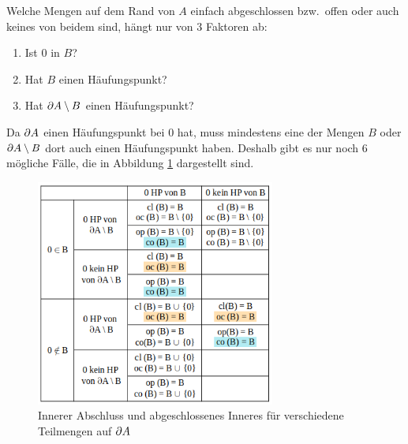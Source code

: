     Welche
    Mengen auf dem Rand von $A$ einfach abgeschlossen bzw.\ offen oder auch keines von beidem sind, hängt nur von 3 Faktoren ab:
    \begin{enumerate}
        \item Ist $0$ in $B$?
        \item Hat $B$ einen Häufungspunkt?
        \item Hat $\partial A \setminus B$ einen Häufungspunkt?
    \end{enumerate}
    \noindent
    Da $\partial A$ einen Häufungspunkt bei $0$ hat, muss mindestens eine der Mengen $B$ oder $\partial A \setminus B$ dort auch einen Häufungspunkt haben.
    Deshalb gibt es nur noch 6 mögliche Fälle, die in Abbildung \ref{fig:tab-standardbsp} dargestellt sind.
%    
    \begin{figure}[ht]
        \centering
        \includegraphics[width=0.7\textwidth]{abb/tab-standardbsp.png}
        \caption{Innerer Abschluss und abgeschlossenes Inneres für verschiedene Teilmengen auf $\partial A$}
        \label{fig:tab-standardbsp}
    \end{figure}
%    
%    
